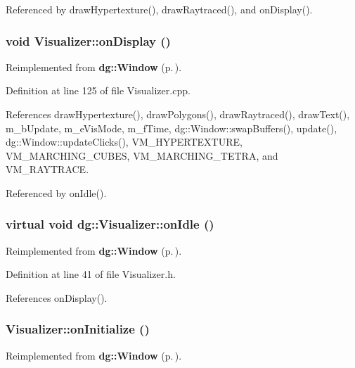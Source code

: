 Referenced by draw\-Hypertexture(), draw\-Raytraced(), and on\-Display().
\subsubsection{\setlength{\rightskip}{0pt plus 5cm}void Visualizer::on\-Display ()\hspace{0.3cm}{\tt  [virtual]}}\label{classdg_1_1Visualizer_a5}




Reimplemented from {\bf dg::Window} {\rm (p.\,\pageref{classdg_1_1Window_a7})}.

Definition at line 125 of file Visualizer.cpp.

References draw\-Hypertexture(), draw\-Polygons(), draw\-Raytraced(), draw\-Text(), m\_\-b\-Update, m\_\-e\-Vis\-Mode, m\_\-f\-Time, dg::Window::swap\-Buffers(), update(), dg::Window::update\-Clicks(), VM\_\-HYPERTEXTURE, VM\_\-MARCHING\_\-CUBES, VM\_\-MARCHING\_\-TETRA, and VM\_\-RAYTRACE.

Referenced by on\-Idle().
\subsubsection{\setlength{\rightskip}{0pt plus 5cm}virtual void dg::Visualizer::on\-Idle ()\hspace{0.3cm}{\tt  [inline, virtual]}}\label{classdg_1_1Visualizer_a6}




Reimplemented from {\bf dg::Window} {\rm (p.\,\pageref{classdg_1_1Window_a17})}.

Definition at line 41 of file Visualizer.h.

References on\-Display().
\subsubsection{ Visualizer::on\-Initialize ()\hspace{0.3cm}{\tt  [virtual]}}\label{classdg_1_1Visualizer_a3}




Reimplemented from {\bf dg::Window} {\rm (p.\,\pageref{classdg_1_1Window_a2})}.

